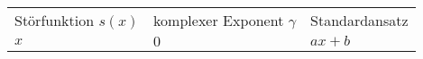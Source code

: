 

\def\arraystretch{1.5}
\noindent
\begin{longtable}{@{}p{}|p{}|p{}}
\hline
Störfunktion $s(x)$ & komplexer Exponent $\gamma$ & Standardansatz \\
$x$ & $0$ & $ax+b$ \\
\end{longtable}
